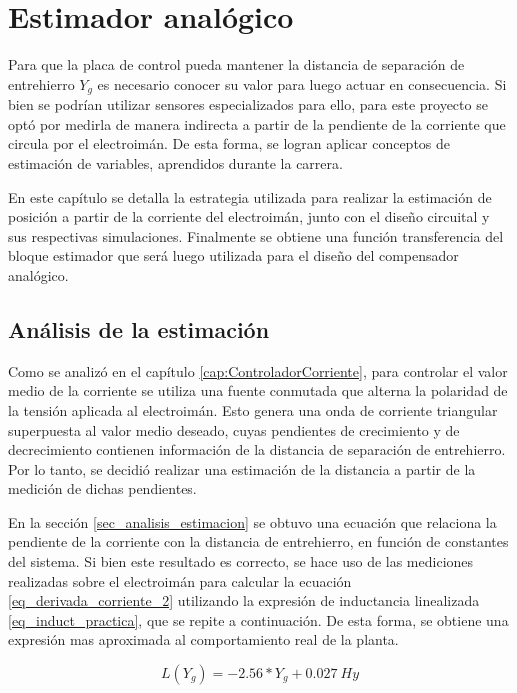 \chapter{Estimador analógico}  \label{cap:Estimador Analogico}

Para que la placa de control pueda mantener la distancia de separación de entrehierro $Y_{g}$ es necesario conocer su valor para luego actuar en consecuencia. Si bien se podrían utilizar sensores  especializados para ello, para este proyecto se optó por medirla de manera indirecta a partir de la pendiente de la corriente que circula por el electroimán. De esta forma, se logran aplicar conceptos de estimación de variables, aprendidos durante la carrera. 

En este capítulo se detalla la estrategia utilizada para realizar la estimación de posición a partir de la corriente del electroimán, junto con el diseño circuital y sus respectivas simulaciones. Finalmente se obtiene una función transferencia del bloque estimador que será luego utilizada para el diseño del compensador analógico.

\section{Análisis de la estimación}\label{analisis_de_estimacion}

Como se analizó en el capítulo \ref{cap:ControladorCorriente}, para controlar el valor medio de la corriente se utiliza una fuente conmutada que alterna la polaridad de la tensión aplicada al electroimán. Esto genera una onda de corriente triangular superpuesta al valor medio deseado, cuyas pendientes de crecimiento y de decrecimiento contienen información de la distancia de separación de entrehierro. Por lo tanto, se decidió realizar una estimación de la distancia a partir de la medición de dichas pendientes.

En la sección \ref{sec_analisis_estimacion} se obtuvo una ecuación que relaciona la pendiente de la corriente con la distancia de entrehierro, en función de constantes del sistema. Si bien este resultado es correcto, se hace uso de las mediciones realizadas sobre el electroimán para calcular la ecuación \ref{eq_derivada_corriente_2} utilizando la expresión de inductancia linealizada \ref{eq_induct_practica}, que se repite a continuación. De esta forma, se obtiene una expresión mas aproximada al comportamiento real de la planta.

\begin{equation*}
	L(Y_g)=-2.56*Y_{g}+0.027\:Hy
\end{equation*}

